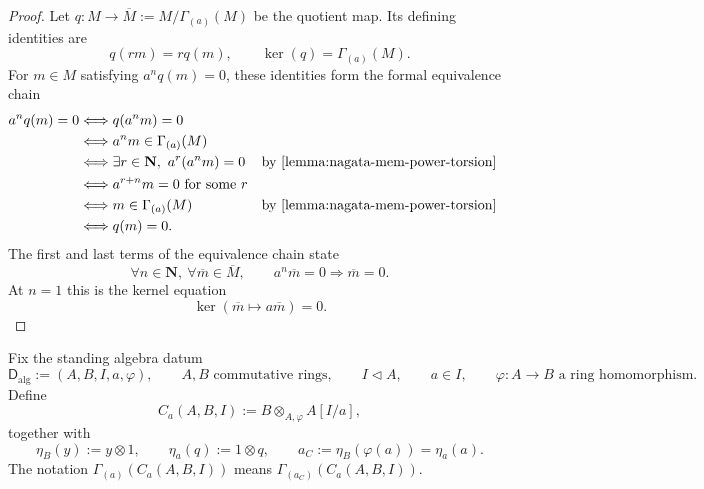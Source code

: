 \begin{proof}
  \leanok
  Let
  $q\colon M\to\overline M:=M/\Gamma_{(a)}(M)$ be the quotient map.  Its
  defining identities are
  \[
    q(rm)=r q(m),\qquad
    \ker(q)=\Gamma_{(a)}(M).
  \]
  For $m\in M$ satisfying $a^nq(m)=0$, these identities form the formal
  equivalence chain
  \[
  \begin{aligned}
    a^nq(m)=0
      &\Longleftrightarrow q(a^nm)=0\\
      &\Longleftrightarrow a^nm\in\Gamma_{(a)}(M)\\
      &\Longleftrightarrow
        \exists r\in\mathbf N,\ a^r(a^nm)=0
        &&\text{by \Cref{lemma:nagata-mem-power-torsion}}\\
      &\Longleftrightarrow a^{r+n}m=0\text{ for some }r\\
      &\Longleftrightarrow m\in\Gamma_{(a)}(M)
        &&\text{by \Cref{lemma:nagata-mem-power-torsion}}\\
      &\Longleftrightarrow q(m)=0.
  \end{aligned}
  \]
  The first and last terms of the equivalence chain state
  \[
    \forall n\in\mathbf N,\ \forall\overline m\in\overline M,\qquad
    a^n\overline m=0\Longrightarrow\overline m=0.
  \]
  At $n=1$ this is the kernel equation
  \[
    \ker(\overline m\mapsto a\overline m)=0.
  \]
\end{proof}

\begin{definition}
  \label{def:nagata-strict-transform-basechange-chart-ring}
  \lean{}

  Fix the standing algebra datum
  \[
    \mathsf D_{\mathrm{alg}}
      :=(A,B,I,a,\varphi),\qquad
    A,B\text{ commutative rings},\qquad
    I\triangleleft A,\qquad a\in I,\qquad
    \varphi\colon A\to B\text{ a ring homomorphism}.                \tag{STAlg0}
  \]
  Define
  \[
    C_a(A,B,I):=B\otimes_{A,\varphi}A[I/a],
  \]
  together with
  \[
    \eta_B(y):=y\otimes1,\qquad
    \eta_a(q):=1\otimes q,\qquad
    a_C:=\eta_B(\varphi(a))=\eta_a(a).
  \]
  The notation $\Gamma_{(a)}(C_a(A,B,I))$ means
  $\Gamma_{(a_C)}(C_a(A,B,I))$.
\end{definition}

